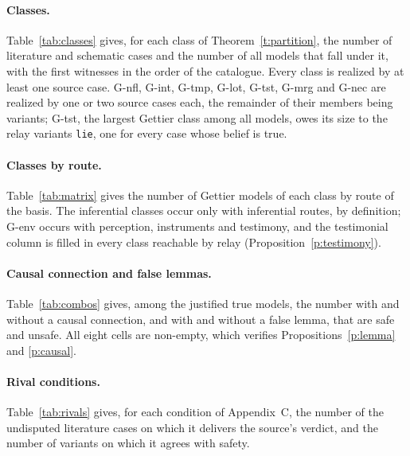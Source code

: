 \documentclass{situationist-preprint}
\begin{document}
\paragraph{Classes.} Table~\ref{tab:classes} gives, for each class of Theorem~\ref{t:partition}, the number of literature and schematic cases and the number of all models that fall under it, with the first witnesses in the order of the catalogue. Every class is realized by at least one source case. G-nfl, G-int, G-tmp, G-lot, G-tst, G-mrg and G-nec are realized by one or two source cases each, the remainder of their members being variants; G-tst, the largest Gettier class among all models, owes its size to the relay variants \texttt{lie}, one for every case whose belief is true.

\begin{table}[h]\caption{Classes of the typology.}\label{tab:classes}

\end{table}

\paragraph{Classes by route.} Table~\ref{tab:matrix} gives the number of Gettier models of each class by route of the basis. The inferential classes occur only with inferential routes, by definition; G-env occurs with perception, instruments and testimony, and the testimonial column is filled in every class reachable by relay (Proposition~\ref{p:testimony}).

\begin{table}[h]\caption{Gettier models by class and route.}\label{tab:matrix}

\end{table}

\paragraph{Causal connection and false lemmas.} Table~\ref{tab:combos} gives, among the justified true models, the number with and without a causal connection, and with and without a false lemma, that are safe and unsafe. All eight cells are non-empty, which verifies Propositions~\ref{p:lemma} and \ref{p:causal}.

\begin{table}[h]\caption{Causal connection, false lemmas and safety among justified true models.}\label{tab:combos}

\end{table}

\paragraph{Rival conditions.} Table~\ref{tab:rivals} gives, for each condition of Appendix~C, the number of the \stnundisputed{} undisputed literature cases on which it delivers the source's verdict, and the number of variants on which it agrees with safety.
\end{document}
